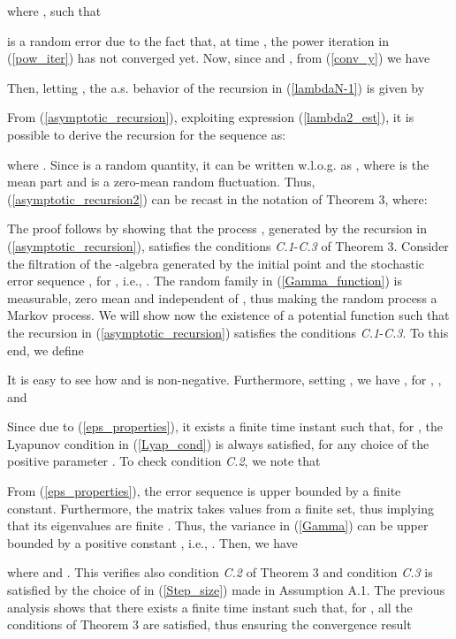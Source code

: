 \documentclass[10pt,twocolumn]{IEEEtran}
\begin{document}
where , such that

is a random error due to the fact that, at time , the power iteration in (\ref{pow_iter}) has not converged yet. Now, since  and , from (\ref{conv_y}) we have

Then, letting , the a.s. behavior of the recursion in (\ref{lambdaN-1}) is given by

From (\ref{asymptotic_recursion}), exploiting expression (\ref{lambda2_est}), it is possible to derive the recursion for the sequence  as:

where . Since  is a random quantity, it can be written w.l.o.g. as , where  is the mean part and  is a zero-mean random fluctuation. Thus, (\ref{asymptotic_recursion2}) can be recast in the notation of Theorem 3, where:

The proof follows by showing that the process , generated by the recursion in (\ref{asymptotic_recursion}), satisfies the  conditions \textit{C.1}-\textit{C.3} of Theorem 3. Consider the filtration of the -algebra generated by the initial point  and the stochastic error sequence , for , i.e.,
.
The random family  in (\ref{Gamma_function}) is  measurable, zero mean and independent of , thus making the random process  a Markov process. We will show now the existence of a potential function  such that the recursion in (\ref{asymptotic_recursion}) satisfies the conditions \textit{C.1}-\textit{C.3}. To this end, we define

It is easy to see how  and is non-negative. Furthermore, setting , we have ,  for , , and

Since  due to (\ref{eps_properties}), it exists a finite time instant  such that, for , the Lyapunov condition in (\ref{Lyap_cond}) is always satisfied, for any choice of the positive parameter . To check condition \textit{C.2}, we note that

From (\ref{eps_properties}), the error sequence  is upper bounded by a finite constant. Furthermore, the matrix  takes values from a finite set, thus implying that its eigenvalues are finite \cite{Horn-Johnson}. Thus, the variance in (\ref{Gamma}) can be upper bounded by a positive constant , i.e., . Then, we have

where  and .  This verifies also condition \textit{C.2} of Theorem 3 and condition \textit{C.3} is satisfied by the choice of  in (\ref{Step_size}) made in Assumption A.1. The previous analysis shows that there exists a finite time instant  such that, for , all the conditions of Theorem 3 are satisfied, thus ensuring the convergence result
\end{document}
